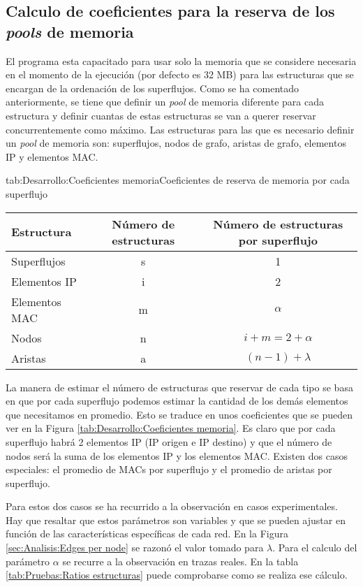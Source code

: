 \documentclass[tfg,epsbased,lof,lot,loa,final,nocopyright,overleaf]{tfgtfmthesisuam}
\begin{document}
\subsection{Calculo de coeficientes para la reserva de los \textit{pools} de memoria}
\label{subsec:Desarrollo:IPMAC:CoefPools}
El programa esta capacitado para usar solo la memoria que se considere necesaria en el momento de la ejecución (por defecto es 32 MB) para las estructuras que se encargan de la ordenación de los superflujos. Como se ha comentado anteriormente, se tiene que definir un \textit{pool} de memoria diferente para cada estructura y definir cuantas de estas estructuras se van a querer reservar concurrentemente como máximo. Las estructuras para las que es necesario definir un \textit{pool} de memoria son: superflujos, nodos de grafo, aristas de grafo, elementos IP y elementos MAC.

\begin{table}{tab:Desarrollo:Coeficientes memoria}{Coeficientes de reserva de memoria por cada superflujo}
	\begin{tabular}{lcc}
		\toprule \textbf{Estructura} & \textbf{Número de estructuras}  & \textbf{Número de estructuras por superflujo} \\ \midrule
		Superflujos & s & 1 \\
		Elementos IP & i & 2 \\
		Elementos MAC & m & $\alpha$ \\
		Nodos & n & $i + m = 2 + \alpha$ \\
		Aristas & a & $(n - 1) + \lambda$  \\ \bottomrule
	\end{tabular}
\end{table}

La manera de estimar el número de estructuras que reservar de cada tipo se basa en que por cada superflujo podemos estimar la cantidad de los demás elementos que necesitamos en promedio. Esto se traduce en unos coeficientes que se pueden ver en la Figura \ref{tab:Desarrollo:Coeficientes memoria}. Es claro que por cada superflujo habrá 2 elementos IP (IP origen e IP destino) y que el número de nodos será la suma de los elementos IP y los elementos MAC. Existen dos casos especiales: el promedio de MACs por superflujo y el promedio de aristas por superflujo.

Para estos dos casos se ha recurrido a la observación en casos experimentales. Hay que resaltar que estos parámetros son variables y que se pueden ajustar en función de las características específicas de cada red. En la Figura \ref{sec:Analisis:Edges per node} se razonó el valor tomado para $\lambda$. Para el calculo del parámetro $\alpha$ se recurre a la observación en trazas reales. En la tabla \ref{tab:Pruebas:Ratios estructuras} puede comprobarse como se realiza ese cálculo.
\end{document}
